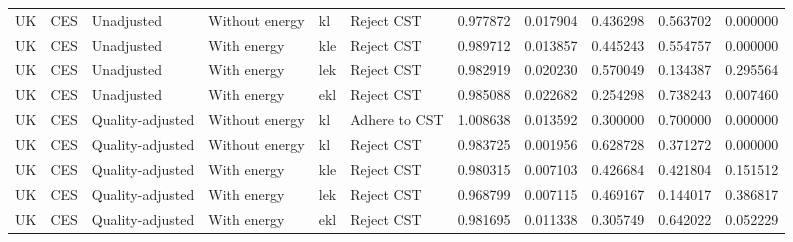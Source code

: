 \documentclass[preprint,authoryear,12pt]{elsarticle}\usepackage[]{graphicx}\usepackage[]{color}
\begin{document}
\begin{table}[ht]
{\begin{tabular}{llllllrrrrr}
  UK & CES & Unadjusted & Without energy & kl & Reject CST & 0.977872 & 0.017904 & 0.436298 & 0.563702 & 0.000000 \\ 
  UK & CES & Unadjusted & With energy & kle & Reject CST & 0.989712 & 0.013857 & 0.445243 & 0.554757 & 0.000000 \\ 
  UK & CES & Unadjusted & With energy & lek & Reject CST & 0.982919 & 0.020230 & 0.570049 & 0.134387 & 0.295564 \\ 
  UK & CES & Unadjusted & With energy & ekl & Reject CST & 0.985088 & 0.022682 & 0.254298 & 0.738243 & 0.007460 \\ 
  UK & CES & Quality-adjusted & Without energy & kl & Adhere to CST & 1.008638 & 0.013592 & 0.300000 & 0.700000 & 0.000000 \\ 
  UK & CES & Quality-adjusted & Without energy & kl & Reject CST & 0.983725 & 0.001956 & 0.628728 & 0.371272 & 0.000000 \\ 
  UK & CES & Quality-adjusted & With energy & kle & Reject CST & 0.980315 & 0.007103 & 0.426684 & 0.421804 & 0.151512 \\ 
  UK & CES & Quality-adjusted & With energy & lek & Reject CST & 0.968799 & 0.007115 & 0.469167 & 0.144017 & 0.386817 \\ 
  UK & CES & Quality-adjusted & With energy & ekl & Reject CST & 0.981695 & 0.011338 & 0.305749 & 0.642022 & 0.052229 \\ 
   \hline
\end{tabular}
}
\end{table}
\end{document}
